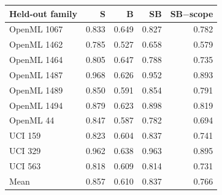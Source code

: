 \begin{tabular}{lrrrr}\toprule
Held-out family & S & B & SB & SB$-$scope\\\midrule
OpenML 1067 & 0.833 & 0.649 & 0.827 & 0.782\\
OpenML 1462 & 0.785 & 0.527 & 0.658 & 0.579\\
OpenML 1464 & 0.805 & 0.647 & 0.788 & 0.735\\
OpenML 1487 & 0.968 & 0.626 & 0.952 & 0.893\\
OpenML 1489 & 0.850 & 0.591 & 0.854 & 0.791\\
OpenML 1494 & 0.879 & 0.623 & 0.898 & 0.819\\
OpenML 44 & 0.847 & 0.587 & 0.782 & 0.694\\
UCI 159 & 0.823 & 0.604 & 0.837 & 0.741\\
UCI 329 & 0.962 & 0.638 & 0.963 & 0.895\\
UCI 563 & 0.818 & 0.609 & 0.814 & 0.731\\
\midrule Mean & 0.857 & 0.610 & 0.837 & 0.766\\
\bottomrule\end{tabular}
